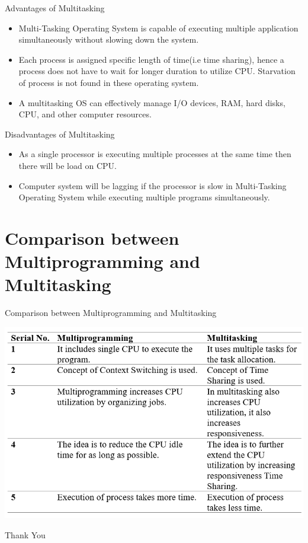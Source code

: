 \documentclass{beamer}
\begin{document}
\begin{frame}{Advantages of Multitasking}
    \begin{itemize}
        \item Multi-Tasking Operating System is capable of executing multiple application simultaneously without slowing down the system.
        \item Each process is assigned specific length of time(i.e time sharing), hence a process does not have to wait for longer duration to utilize CPU. Starvation of process is not found in these operating system.
        \item A multitasking OS can effectively manage I/O devices, RAM, hard disks, CPU, and other computer resources.
    \end{itemize}
\end{frame}

\begin{frame}{Disadvantages of Multitasking}
    \begin{itemize}
        \item As a single processor is executing multiple processes at the same time then there will be load on CPU.
        \item Computer system will be lagging if the processor is slow in Multi-Tasking Operating System while executing multiple programs simultaneously.
    \end{itemize}
\end{frame}



\section{Comparison between Multiprogramming and Multitasking}



\begin{frame}{Comparison between Multiprogramming and Multitasking}
	
	
\includegraphics[width=1\textwidth, height=0.85\textheight]{ss1}

\end{frame}




\begin{frame}
\Huge{\centerline{Thank You}}
\end{frame}

\end{document}
